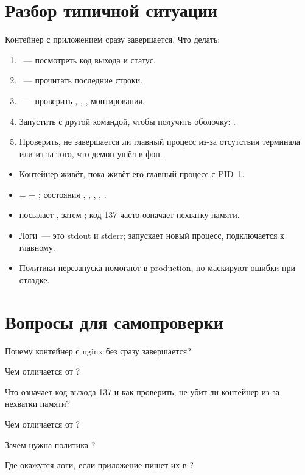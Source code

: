 \section{Разбор типичной ситуации}

Контейнер с приложением сразу завершается. Что делать:

\begin{enumerate}
  \item {}~--- посмотреть код выхода и статус.
  \item {}~--- прочитать последние строки.
  \item {}~--- проверить , ,
        , монтирования.
  \item Запустить с другой командой, чтобы получить оболочку:
        .
  \item Проверить, не завершается ли главный процесс из-за отсутствия
        терминала или из-за того, что демон ушёл в фон.
\end{enumerate}

\begin{summarybox}
\begin{itemize}
  \item Контейнер живёт, пока живёт его главный процесс с PID~1.
  \item {} =  + ; состояния
        , , , ,
        .
  \item {} посылает , затем ;
        код 137 часто означает нехватку памяти.
  \item Логи~--- это stdout и stderr;  запускает новый процесс,
         подключается к главному.
  \item Политики перезапуска помогают в production, но маскируют
        ошибки при отладке.
\end{itemize}
\end{summarybox}

\section*{Вопросы для самопроверки}
\begin{selfcheck}
  \item Почему контейнер с nginx без  сразу завершается?
  \item Чем  отличается от ?
  \item Что означает код выхода 137 и как проверить, не убит ли контейнер
        из-за нехватки памяти?
  \item Чем  отличается от ?
  \item Зачем нужна политика ?
  \item Где окажутся логи, если приложение пишет их в
        ?
\end{selfcheck}
